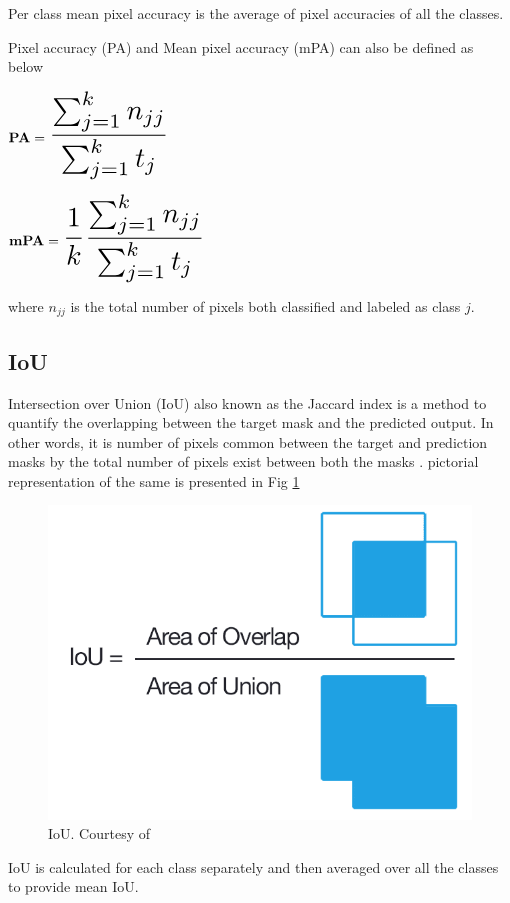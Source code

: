     Per class mean pixel accuracy is the average of pixel accuracies of all the classes.
    
    Pixel accuracy (PA) and Mean pixel accuracy (mPA) can also be defined as below \cite{84_ulku2022survey}
    
    $
    {\bf PA } = \scalemath{2}{\frac{\sum_{j=1}^{k} n_{jj}}{\sum_{j=1}^{k} t_j} }
    $
    
    $
    {\bf mPA } = \scalemath{2}{\frac{1}{k} \frac{\sum_{j=1}^{k} n_{jj}}{\sum_{j=1}^{k} t_j}}
    $
    
    where $n_{jj}$ is the total number of pixels both classified and labeled as class $j$. 
    
    \subsection{IoU}
    
    Intersection over Union (IoU) also known as the Jaccard index is a method to quantify the overlapping between the target mask and the predicted output. In other words, it is number of pixels common between the target and prediction masks by the total number of pixels exist between both the masks \cite{83_iou}. pictorial representation of the same is presented in Fig \ref{fig:IoU}
    
    \begin{figure}[h]
    	\centering
    	\includegraphics[width=12cm]{images/IoU.png}
    	\caption{IoU. Courtesy of \cite{82_iou}}
    	\label{fig:IoU}
    \end{figure}  
	
	IoU is calculated for each class separately and then averaged over all the classes to provide mean IoU.  
	
